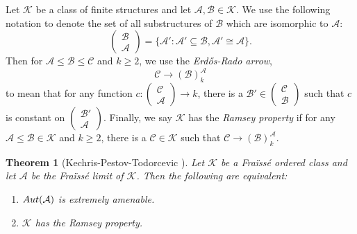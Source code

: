 \documentclass{amsart}
\newtheorem{theorem}{Theorem}[section]
\theoremstyle{definition}
\theoremstyle{remark}
\begin{document}
Let $\mathcal{K}$ be a class of finite structures and let $\mathcal{A}, \mathcal{B} \in \mathcal{K}$. We use the following notation to denote the set of all substructures of $\mathcal{B}$ which are isomorphic to $\mathcal{A}$: 
    \begin{equation*}
        \begin{pmatrix}
            \mathcal{B} \\ 
            \mathcal{A}
        \end{pmatrix} = \{\mathcal{A'}\colon \mathcal{A'} \subseteq \mathcal{B}, \mathcal{A'} \cong \mathcal{A} \}. 
    \end{equation*}
    Then for $\mathcal{A} \leq \mathcal{B} \leq \mathcal{C}$ and $k\geq 2$, we use the {\em Erd\H{o}s-Rado arrow}, 
    \begin{equation*}
        \mathcal{C} \rightarrow (\mathcal{B})^{\mathcal{A}}_k
    \end{equation*}
    to mean that for any function $c: 
    \begin{pmatrix}
        \mathcal{C} \\ 
        \mathcal{A}
    \end{pmatrix} \rightarrow k$, there is a $\mathcal{B'} \in 
    \begin{pmatrix}
        \mathcal{C} \\
        \mathcal{B}
    \end{pmatrix}$ such that $c$ is constant on $
    \begin{pmatrix}
        \mathcal{B'} \\
        \mathcal{A}
    \end{pmatrix}.$
    Finally, we say $\mathcal{K}$ has the {\em Ramsey property} if for any $\mathcal{A} \leq \mathcal{B} \in \mathcal{K}$ and $k \geq 2$, there is a $\mathcal{C} \in \mathcal{K}$ such that $\mathcal{C} \rightarrow (\mathcal{B})^\mathcal{A}_k$. 

    \begin{theorem}[Kechris-Pestov-Todorcevic \cite{KPT}]\label{thm:KPT}
        Let $\mathcal{K}$ be a Fra\"iss\'e ordered class and let $\mathcal{A}$ be the Fra\"iss\'e limit of $\mathcal{K}$. Then the following are equivalent:
        \begin{enumerate}
            \item[\rm (1)] ${\rm Aut}(\mathcal{A})$ is extremely amenable. 
            \item[\rm (2)] $\mathcal{K}$ has the Ramsey property. 
        \end{enumerate}
    \end{theorem}
\end{document}
